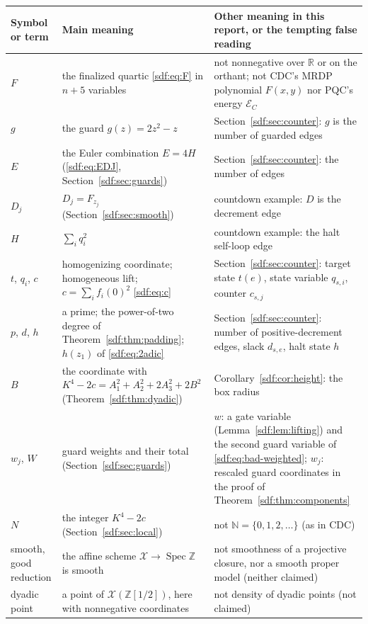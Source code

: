 \documentclass[11pt,a4paper]{article}
\theoremstyle{definition}
\theoremstyle{remark}
\newcommand{\N}{\mathbb N}
\newcommand{\Z}{\mathbb Z}
\newcommand{\R}{\mathbb R}
\newcommand{\Spec}{\operatorname{Spec}}
\newcommand{\guard}{g}
\newcommand{\variety}{\mathcal X}
\begin{document}
\begin{center}
\small
\begin{longtable}{@{}>{\raggedright\arraybackslash}p{}%
 >{\raggedright\arraybackslash}p{}%
 >{\raggedright\arraybackslash}p{}@{}}
\toprule
Symbol or term & Main meaning & Other meaning in this report, or the tempting false reading\\
\midrule
\endhead
$F$ & the finalized quartic \eqref{sdf:eq:F} in $n+5$ variables & not nonnegative over $\R$ or on the orthant; not CDC's MRDP polynomial $F(x,y)$ nor PQC's energy $\mathcal E_C$\\
$g$ & the guard $\guard(z)=2z^2-z$ & Section~\ref{sdf:sec:counter}: $g$ is the number of guarded edges\\
$E$ & the Euler combination $E=4H$ (\eqref{sdf:eq:EDJ}, Section~\ref{sdf:sec:guards}) & Section~\ref{sdf:sec:counter}: the number of edges\\
$D_j$ & $D_j=F_{z_j}$ (Section~\ref{sdf:sec:smooth}) & countdown example: $D$ is the decrement edge\\
$H$ & $\sum_i q_i^2$ & countdown example: the halt self-loop edge\\
$t$, $q_i$, $c$ & homogenizing coordinate; homogeneous lift; $c=\sum_if_i(0)^2$ \eqref{sdf:eq:c} & Section~\ref{sdf:sec:counter}: target state $t(e)$, state variable $q_{s,i}$, counter $c_{s,j}$\\
$p$, $d$, $h$ & a prime; the power-of-two degree of Theorem~\ref{sdf:thm:padding}; $h(z_1)$ of \eqref{sdf:eq:2adic} & Section~\ref{sdf:sec:counter}: number of positive-decrement edges, slack $d_{s,e}$, halt state $h$\\
$B$ & the coordinate with $K^4-2c=A_1^2+A_2^2+2A_3^2+2B^2$ (Theorem~\ref{sdf:thm:dyadic}) & Corollary~\ref{sdf:cor:height}: the box radius\\
$w_j$, $W$ & guard weights and their total (Section~\ref{sdf:sec:guards}) & $w$: a gate variable (Lemma~\ref{sdf:lem:lifting}) and the second guard variable of \eqref{sdf:eq:bad-weighted}; $w_j$: rescaled guard coordinates in the proof of Theorem~\ref{sdf:thm:components}\\
$N$ & the integer $K^4-2c$ (Section~\ref{sdf:sec:local}) & not $\N=\{0,1,2,\ldots\}$ (as in CDC)\\
smooth, good reduction & the affine scheme $\variety\to\Spec\Z$ is smooth & not smoothness of a projective closure, nor a smooth proper model (neither claimed)\\
dyadic point & a point of $\variety(\Z[1/2])$, here with nonnegative coordinates & not density of dyadic points (not claimed)\\

\end{longtable}
\end{center}
\end{document}

